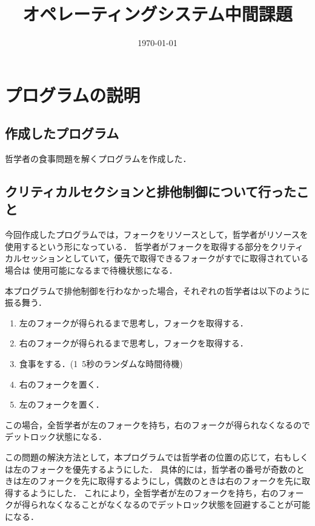\documentclass[a4paper,dvipdfmx]{jsarticle}
\begin{document}
\title{オペレーティングシステム中間課題}
\author{}
\date{\today}
\maketitle
\section{プログラムの説明}
    \subsection{作成したプログラム}
        哲学者の食事問題を解くプログラムを作成した．
    \subsection{クリティカルセクションと排他制御について行ったこと}
        今回作成したプログラムでは，フォークをリソースとして，哲学者がリソースを使用するという形になっている．
        哲学者がフォークを取得する部分をクリティカルセッションとしていて，優先で取得できるフォークがすでに取得されている場合は
        使用可能になるまで待機状態になる．\par
        本プログラムで排他制御を行わなかった場合，それぞれの哲学者は以下のように振る舞う．
        \begin{enumerate}
            \item 左のフォークが得られるまで思考し，フォークを取得する．
            \item 右のフォークが得られるまで思考し，フォークを取得する．
            \item 食事をする．(1~5秒のランダムな時間待機)
            \item 右のフォークを置く．
            \item 左のフォークを置く．
         \end{enumerate}
         この場合，全哲学者が左のフォークを持ち，右のフォークが得られなくなるのでデットロック状態になる．\par
         この問題の解決方法として，本プログラムでは哲学者の位置の応じて，右もしくは左のフォークを優先するようにした．
         具体的には，哲学者の番号が奇数のときは左のフォークを先に取得するようにし，偶数のときは右のフォークを先に取得するようにした．
         これにより，全哲学者が左のフォークを持ち，右のフォークが得られなくなることがなくなるのでデットロック状態を回避することが可能になる．
\end{document}
